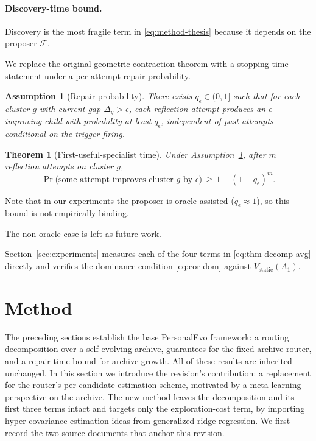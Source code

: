 \documentclass{article} %
\newtheorem{theorem}{Theorem}
\newtheorem{assumption}{Assumption}
\begin{document}
\paragraph{Discovery-time bound.}

\label{sec:method-specialist}

Discovery is the most fragile term in \eqref{eq:method-thesis} because it depends on the proposer $\mathcal{F}$.

We replace the original geometric contraction theorem with a stopping-time statement under a per-attempt repair probability.

\begin{assumption}[Repair probability]
\label{ass:repair}
There exists $q_\epsilon \in (0,1]$ such that for each cluster $g$ with current gap $\Delta_g > \epsilon$, each reflection attempt produces an $\epsilon$-improving child with probability at least $q_\epsilon$, independent of past attempts conditional on the trigger firing.
\end{assumption}

\begin{theorem}[First-useful-specialist time]
\label{thm:specialist}
Under Assumption~\ref{ass:repair}, after $m$ reflection attempts on cluster $g$,
\begin{equation}
\label{eq:thm-specialist}
\Pr\bigl(\text{some attempt improves cluster } g \text{ by } \epsilon\bigr) \,\ge\, 1 - (1 - q_\epsilon)^m.
\end{equation}
\end{theorem}

Note that in our experiments the proposer is oracle-assisted ($q_\epsilon \approx 1$), so this bound is not empirically binding.

The non-oracle case is left as future work.

Section~\ref{sec:experiments} measures each of the four terms in \eqref{eq:thm-decomp-avg} directly and verifies the dominance condition \eqref{eq:cor-dom} against $V_{\mathrm{static}}(A_1)$.

\section{Method}

The preceding sections establish the base PersonalEvo framework: a routing decomposition over a self-evolving archive, guarantees for the fixed-archive router, and a repair-time bound for archive growth. All of these results are inherited unchanged. In this section we introduce the revision's contribution: a replacement for the router's per-candidate estimation scheme, motivated by a meta-learning perspective on the archive. The new method leaves the decomposition and its first three terms intact and targets only the exploration-cost term, by importing hyper-covariance estimation ideas from generalized ridge regression. We first record the two source documents that anchor this revision.
\end{document}
